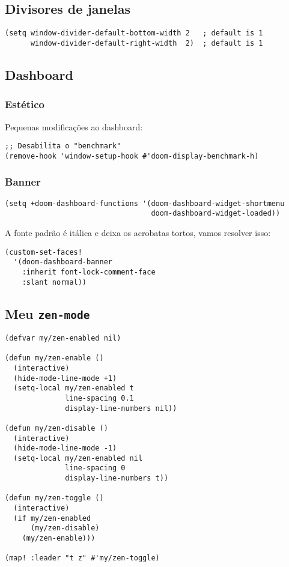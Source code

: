 \documentclass[11pt]{article}
\begin{document}
\subsection{Divisores de janelas}
\label{sec:org277942a}

\begin{verbatim}
(setq window-divider-default-bottom-width 2   ; default is 1
      window-divider-default-right-width  2)  ; default is 1
\end{verbatim}

\subsection{Dashboard}
\label{sec:orgf42ac29}
\subsubsection{Estético}
\label{sec:orgbfe7fe6}

Pequenas modificações ao dashboard:

\begin{verbatim}
;; Desabilita o "benchmark"
(remove-hook 'window-setup-hook #'doom-display-benchmark-h)
\end{verbatim}

\subsubsection{Banner}
\label{sec:org8a4c71c}

\begin{verbatim}
(setq +doom-dashboard-functions '(doom-dashboard-widget-shortmenu
                                  doom-dashboard-widget-loaded))
\end{verbatim}

A fonte padrão é itálica e deixa os acrobatas tortos, vamos resolver isso:

\begin{verbatim}
(custom-set-faces!
  '(doom-dashboard-banner
    :inherit font-lock-comment-face
    :slant normal))
\end{verbatim}

\subsection{Meu \texttt{zen-mode}}
\label{sec:org80f4d57}

\begin{verbatim}
(defvar my/zen-enabled nil)

(defun my/zen-enable ()
  (interactive)
  (hide-mode-line-mode +1)
  (setq-local my/zen-enabled t
              line-spacing 0.1
              display-line-numbers nil))

(defun my/zen-disable ()
  (interactive)
  (hide-mode-line-mode -1)
  (setq-local my/zen-enabled nil
              line-spacing 0
              display-line-numbers t))

(defun my/zen-toggle ()
  (interactive)
  (if my/zen-enabled
      (my/zen-disable)
    (my/zen-enable)))

(map! :leader "t z" #'my/zen-toggle)
\end{verbatim}
\end{document}
